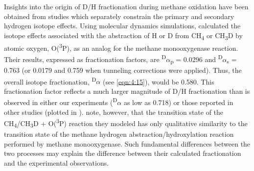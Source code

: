 Insights into the origin of D/H fractionation during methane oxidation
have been obtained from studies which separately constrain the primary
and secondary hydrogen isotope effects. Using molecular dynamics
simulations, \textcite{Pudzianowski+Loew_1983_JPC} calculated the isotope effects
associated with the abstraction of H or D from CH\textsubscript{4} or
CH\textsubscript{3}D by atomic oxygen, O(\textsuperscript{3}P), as an
analog for the methane monooxygenase reaction. Their results, expressed
as fractionation factors, are \textsuperscript{D}$\alpha$\textsubscript{p} =
0.0296 and \textsuperscript{D}$\alpha$\textsubscript{s} = 0.763 (or 0.0179 and
0.759 when tunneling corrections were applied). Thus, the overall
isotope fractionation, \textsuperscript{D}$\alpha$ (see \autoref{eqn:4:15}), would be
0.580. This fractionation factor reflects a much larger magnitude of D/H
fractionation than is observed in either our experiments
(\textsuperscript{D}$\alpha$ as low as 0.718) or those reported in other
studies (plotted in ). \textcite{Pudzianowski+Loew_1983_JPC} note,
however, that the transition state of the
CH\textsubscript{4}/CH\textsubscript{3}D + O(\textsuperscript{3}P)
reaction they modeled has only qualitative similarity to the transition
state of the methane hydrogen abstraction/hydroxylation reaction
performed by methane monooxygenase. Such fundamental differences between
the two processes may explain the difference between their calculated
fractionation and the experimental observations.


